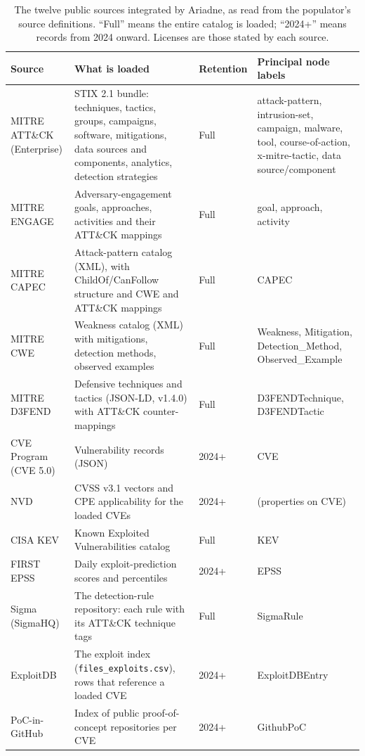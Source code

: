 \documentclass[twocolumn]{svjour3}
\begin{document}
\begin{table}
\centering\footnotesize
\caption{The twelve public sources integrated by Ariadne, as read from the populator's source definitions. ``Full'' means the entire catalog is loaded; ``2024+'' means records from 2024 onward. Licenses are those stated by each source.}\label{tab:sources}
\begin{tabularx}{\textwidth}{@{}p{2.9cm}Xp{1.45cm}p{3.6cm}@{}}
\toprule Source & What is loaded & Retention & Principal node labels \\\midrule
MITRE ATT\&CK (Enterprise) & STIX 2.1 bundle: techniques, tactics, groups, campaigns, software, mitigations, data sources and components, analytics, detection strategies & Full & attack-pattern, intrusion-set, campaign, malware, tool, course-of-action, x-mitre-tactic, data source/component \\
MITRE ENGAGE & Adversary-engagement goals, approaches, activities and their ATT\&CK mappings & Full & goal, approach, activity \\
MITRE CAPEC & Attack-pattern catalog (XML), with ChildOf/CanFollow structure and CWE and ATT\&CK mappings & Full & CAPEC \\
MITRE CWE & Weakness catalog (XML) with mitigations, detection methods, observed examples & Full & Weakness, Mitigation, Detection\_Method, Observed\_Example \\
MITRE D3FEND & Defensive techniques and tactics (JSON-LD, v1.4.0) with ATT\&CK counter-mappings & Full & D3FENDTechnique, D3FENDTactic \\
CVE Program (CVE 5.0) & Vulnerability records (JSON) & 2024+ & CVE \\
NVD & CVSS v3.1 vectors and CPE applicability for the loaded CVEs & 2024+ & (properties on CVE) \\
CISA KEV & Known Exploited Vulnerabilities catalog & Full & KEV \\
FIRST EPSS & Daily exploit-prediction scores and percentiles & 2024+ & EPSS \\
Sigma (SigmaHQ) & The detection-rule repository: each rule with its ATT\&CK technique tags & Full & SigmaRule \\
ExploitDB & The exploit index (\texttt{files\_exploits.csv}), rows that reference a loaded CVE & 2024+ & ExploitDBEntry \\
PoC-in-GitHub & Index of public proof-of-concept repositories per CVE & 2024+ & GithubPoC \\
\bottomrule
\end{tabularx}
\end{table}
\end{document}
